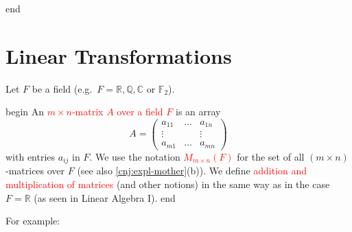 \documentclass[
  12pt,
  a4paper,
  twoside]{article}
\theoremstyle{plain}
\theoremstyle{definition}
\begin{document}
\csname end

\newpage

\hypertarget{lt}{%
\section{Linear Transformations}\label{lt}}

Let \(F\) be a field (e.g.~\(F = \mathbb{R}, \mathbb{Q}, \mathbb{C}\) or \(\mathbb{F}_{2}\)).

\csname begin\label{cnj:defn-matrix}
An \textcolor{red}{$m \times n$-matrix $A$ over a field $F$} is an array
\[ A = \begin{pmatrix} a_{11} & \dots & a_{1n} \\ \vdots & & \vdots \\ a_{m1} & \dots & a_{mn} \end{pmatrix} \]
with entries \(a_{ij}\) in \(F\).
We use the notation \textcolor{red}{$M_{m \times n}(F)$} for the set of all \((m \times n)\)-matrices over \(F\) (see also \ref{cnj:expl-mother}(b)).
We define \textcolor{red}{addition and multiplication of matrices} (and other notions) in the same way as in the case \(F = \mathbb{R}\) (as seen in Linear Algebra I).
\csname end

For example:
\end{document}
